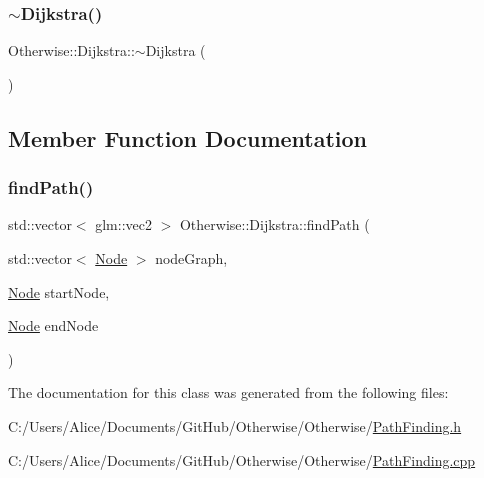 \subsubsection{\texorpdfstring{$\sim$\+Dijkstra()}{~Dijkstra()}}
{\footnotesize\ttfamily Otherwise\+::\+Dijkstra\+::$\sim$\+Dijkstra (\begin{DoxyParamCaption}{ }\end{DoxyParamCaption})}



\subsection{Member Function Documentation}
\mbox{\label{class_otherwise_1_1_dijkstra_a8dc4ac530a7eb88cd7f5546c6a784ac3}} 
\subsubsection{\texorpdfstring{find\+Path()}{findPath()}}
{\footnotesize\ttfamily std\+::vector$<$ glm\+::vec2 $>$ Otherwise\+::\+Dijkstra\+::find\+Path (\begin{DoxyParamCaption}\item[{std\+::vector$<$ \hyperlink{struct_otherwise_1_1_node}{Node} $>$}]{node\+Graph,  }\item[{\hyperlink{struct_otherwise_1_1_node}{Node}}]{start\+Node,  }\item[{\hyperlink{struct_otherwise_1_1_node}{Node}}]{end\+Node }\end{DoxyParamCaption})}



The documentation for this class was generated from the following files\+:\begin{DoxyCompactItemize}
\item 
C\+:/\+Users/\+Alice/\+Documents/\+Git\+Hub/\+Otherwise/\+Otherwise/\hyperlink{_path_finding_8h}{Path\+Finding.\+h}\item 
C\+:/\+Users/\+Alice/\+Documents/\+Git\+Hub/\+Otherwise/\+Otherwise/\hyperlink{_path_finding_8cpp}{Path\+Finding.\+cpp}\end{DoxyCompactItemize}
